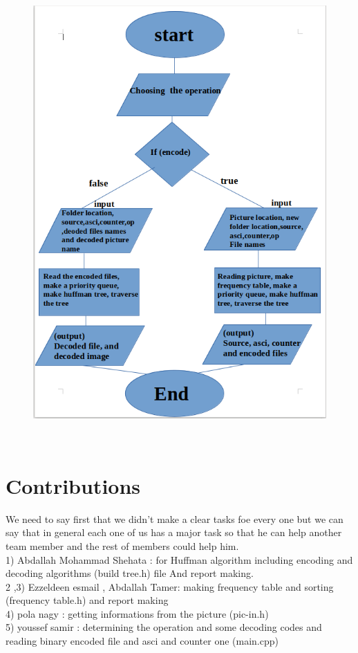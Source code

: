 \documentclass[11 pt,twocolumn,letterpaper]{article}
\begin{document}
\begin{figure}[ht]
\includegraphics[width=0.8\linewidth]{figure 9}
\end{figure}\\
\newpage

\section{Contributions}
We need to say first that we didn’t make a clear tasks foe every one but we can say that in general each one of us has a major task so that he can help another team member and the rest of members could help him.\\
1) Abdallah Mohammad Shehata : for Huffman algorithm including encoding and decoding algorithms (build tree.h) file And report making.\\
2 ,3) Ezzeldeen esmail , Abdallah Tamer: making frequency table and sorting (frequency table.h) and report making\\
4) pola nagy : getting informations from the picture (pic-in.h)\\
5) youssef samir : determining the operation and some decoding codes and reading binary encoded file and asci and counter one (main.cpp)\\




\end{document}
